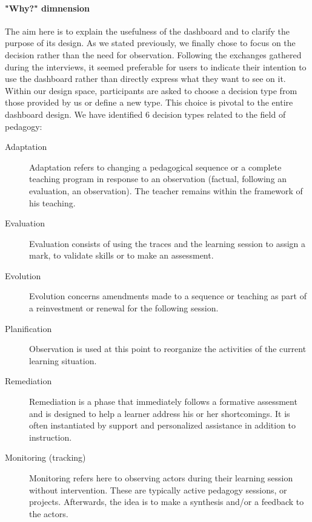 \documentclass[manuscript,nonacm,12pt]{acmart}
\begin{document}
\paragraph{"Why?" dimnension}
The aim here is to explain the usefulness of the dashboard and to clarify the purpose of its design. As we stated previously, we finally chose to focus on the decision rather than the need for observation. Following the exchanges gathered during the interviews, it seemed preferable for users to indicate their intention to use the dashboard rather than directly express what they want to see on it. Within our design space, participants are asked to choose a decision type from those provided by us or define a new type. This choice is pivotal to the entire dashboard design. We have identified 6 decision types related to the field of pedagogy:
\begin{description}
    \item[Adaptation] Adaptation refers to changing a pedagogical sequence or a complete teaching program in response to an observation (factual, following an evaluation, an observation). The teacher remains within the framework of his teaching.
    \item[Evaluation] Evaluation consists of using the traces and the learning session to assign a mark, to validate skills or to make an assessment.
    \item[Evolution]  Evolution concerns amendments made to a sequence or teaching as part of a reinvestment or  renewal for the following session.
    \item[Planification] Observation is used at this point to reorganize the activities of the current learning situation.
    \item[Remediation] Remediation is a phase that immediately follows a formative assessment and is designed to help a learner address his or her shortcomings. It is often instantiated by support and personalized assistance in addition to instruction.
    \item[Monitoring (tracking)] Monitoring refers here to observing actors during their learning session without intervention. These are typically active pedagogy sessions, or projects. Afterwards, the idea is to make a synthesis and/or a feedback to the actors. 
\end{description}
\end{document}
